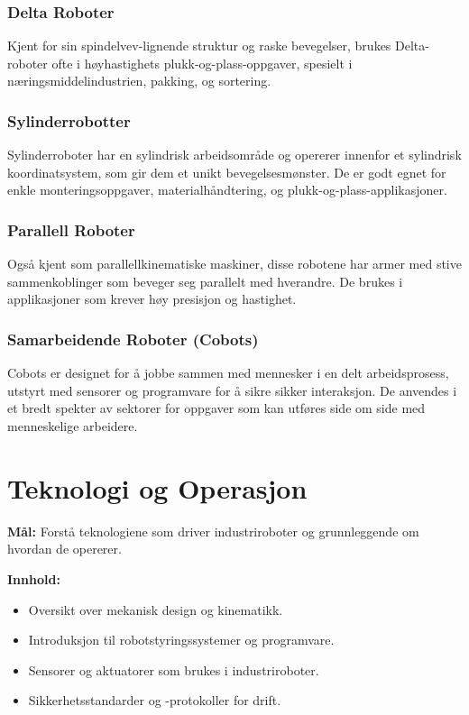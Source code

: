 \subsubsection{Delta Roboter}

Kjent for sin spindelvev-lignende struktur og raske bevegelser, brukes Delta-roboter ofte i høyhastighets plukk-og-plass-oppgaver, spesielt i næringsmiddelindustrien, pakking, og sortering.

\subsubsection{Sylinderrobotter}

Sylinderroboter har en sylindrisk arbeidsområde og opererer innenfor et sylindrisk koordinatsystem, som gir dem et unikt bevegelsesmønster. De er godt egnet for enkle monteringsoppgaver, materialhåndtering, og plukk-og-plass-applikasjoner.

\subsubsection{Parallell Roboter}

Også kjent som parallellkinematiske maskiner, disse robotene har armer med stive sammenkoblinger som beveger seg parallelt med hverandre. De brukes i applikasjoner som krever høy presisjon og hastighet.

\subsubsection{Samarbeidende Roboter (Cobots)}

Cobots er designet for å jobbe sammen med mennesker i en delt arbeidsprosess, utstyrt med sensorer og programvare for å sikre sikker interaksjon. De anvendes i et bredt spekter av sektorer for oppgaver som kan utføres side om side med menneskelige arbeidere.




\section{Teknologi og Operasjon}

\textbf{Mål:} Forstå teknologiene som driver industriroboter og grunnleggende om hvordan de opererer.

\textbf{Innhold:}
\begin{itemize}
    \item Oversikt over mekanisk design og kinematikk.
    \item Introduksjon til robotstyringssystemer og programvare.
    \item Sensorer og aktuatorer som brukes i industriroboter.
    \item Sikkerhetsstandarder og -protokoller for drift.
\end{itemize}


